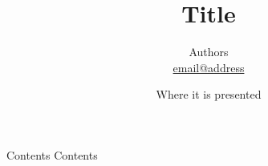 

\title{{\bfseries Title}}
\date{
  Where it is presented
}

\graphicspath{{.}}

\author{
  Authors\\
  {\normalfont\footnotesize\url{email@address}}
}
\subtitle{}



\begin{frame}
  \titlepage
\end{frame}

\begin{frame}{Contents}
  Contents
\end{frame}

\begin{frame}
  \titlepage
\end{frame}



